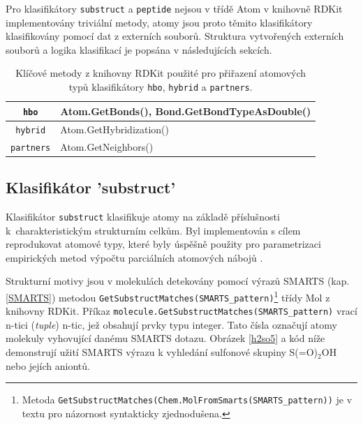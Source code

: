 Pro klasifikátory \verb|substruct| a \verb|peptide| nejsou v třídě Atom v knihovně RDKit implementovány triviální metody, atomy jsou proto těmito klasifikátory klasifikovány pomocí dat z externích souborů. Struktura vytvořených externích souborů a logika  klasifikací je popsána v následujících sekcích. 

\begin{table}[h]
\begin{center}
\label{atom_rdkit_methods}
\renewcommand{\arraystretch}{1.3}
    \begin{small}
    \hspace{7mm}\begin{tabular}{c|l}
        \verb|hbo| & Atom.GetBonds(), Bond.GetBondTypeAsDouble() \\
        \hline
        \verb|hybrid| & Atom.GetHybridization() \\
        \hline
        \verb|partners| & Atom.GetNeighbors() \\
    \end{tabular}
    \end{small}
    \caption{Klíčové metody z knihovny RDKit použité pro přiřazení atomových typů klasifikátory \texttt{hbo}, \texttt{hybrid} a \texttt{partners}.}
\end{center}
\end{table}
\subsection{Klasifikátor 'substruct'}
Klasifikátor \verb|substruct| klasifikuje atomy na základě příslušnosti k~charakteristickým strukturním celkům. Byl implementován s cílem reprodukovat atomové typy, které byly úspěšně použity pro parametrizaci empirických metod výpočtu parciálních atomových nábojů \cite{attyp2, attyp1}. 

Strukturní motivy jsou v molekulách detekovány pomocí výrazů SMARTS (kap. \ref{SMARTS}) metodou  \verb|GetSubstructMatches(SMARTS_pattern)|\footnote{Metoda  \texttt{GetSubstructMatches(Chem.MolFromSmarts(SMARTS\_pattern))} je v textu pro názornost syntakticky zjednodušena.} třídy Mol z kni\-hovny RDKit. 
Příkaz \verb|molecule.GetSubstructMatches(SMARTS_pattern)| 
vrací n-tici (\textit{tuple}) n-tic, jež obsahují prvky typu integer. Tato čísla označují atomy molekuly vyhovující danému SMARTS dotazu. Obrázek \ref{h2so5} a kód níže demonstrují užití SMARTS výrazu k vyhledání sulfonové skupiny S(=O)$_2$OH nebo jejích aniontů.

